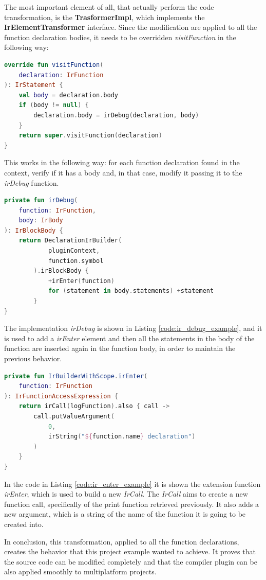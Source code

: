 The most important element of all, that actually perform the code transformation, is the \textbf{TrasformerImpl}, which implements the \textbf{IrElementTransformer} interface.\newline
Since the modification are applied to all the function declaration bodies, it needs to be overridden \textit{visitFunction} in the following way:
\begin{lstlisting}[caption={Example of \textit{visitFunction} implementation of the transformer, used to visit all the function declarations}, captionpos=b, language=Kotlin, label={code:visit_function_declaration_example}]
override fun visitFunction(
    declaration: IrFunction
): IrStatement {
    val body = declaration.body
    if (body != null) {
        declaration.body = irDebug(declaration, body)
    }
    return super.visitFunction(declaration)
}
\end{lstlisting}
This works in the following way: for each function declaration found in the context, verify if it has a body and, in that case, modify it passing it to the \textit{irDebug} function.
\begin{lstlisting}[caption={Example of implementation of a function that adds a new element into the function body}, captionpos=b, language=Kotlin, label={code:ir_debug_example}]
private fun irDebug(
    function: IrFunction,
    body: IrBody
): IrBlockBody {
    return DeclarationIrBuilder(
            pluginContext,
            function.symbol
        ).irBlockBody {
            +irEnter(function)
            for (statement in body.statements) +statement
        }
}
\end{lstlisting}
The implementation \textit{irDebug} is shown in Listing \ref{code:ir_debug_example}, and it is used to add a \textit{irEnter} element and then all the statements in the body of the function are inserted again in the function body, in order to maintain the previous behavior.

\begin{lstlisting}[caption={Example of creation of a new function call and adding to it arguments}, captionpos=b, language=Kotlin, label={code:ir_enter_example}]
private fun IrBuilderWithScope.irEnter(
    function: IrFunction
): IrFunctionAccessExpression {
    return irCall(logFunction).also { call ->
        call.putValueArgument(
            0,
            irString("${function.name} declaration")
        )
    }
}
\end{lstlisting}
In the code in Listing \ref{code:ir_enter_example} it is shown the extension function \textit{irEnter}, which is used to build a new \textit{IrCall}. The \textit{IrCall} aims to create a new function call, specifically of the print function retrieved previously. It also adds a new argument, which is a string of the name of the function it is going to be created into.

In conclusion, this transformation, applied to all the function declarations, creates the behavior that this project example wanted to achieve.\newline
It proves that the source code can be modified completely and that the compiler plugin can be also applied smoothly to multiplatform projects.